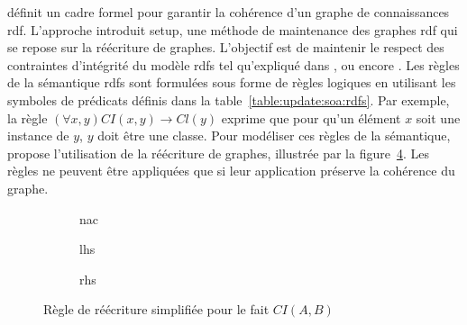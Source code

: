 \cite{chabinUsingGraphGrammar2019} définit un cadre formel pour garantir la cohérence d'un graphe de connaissances \gls{rdf}.
L'approche introduit \gls{setup}, une méthode de maintenance des graphes \gls{rdf} qui se repose sur la réécriture de graphes.
L'objectif est de maintenir le respect des contraintes d'intégrité du modèle \gls{rdfs} tel qu'expliqué dans \cite{flourisFormalFoundationsRDF2013}, \cite{halfedferrariRDFUpdatesConstraints2017} ou encore \cite{chabinConsistentUpdatingDatabases2020}.
Les règles de la sémantique \gls{rdfs} sont formulées sous forme de règles logiques en utilisant les symboles de prédicats définis dans la table~\ref{table:update:soa:rdfs}.
Par exemple, la règle $(\forall x,y) CI(x,y) \to Cl(y)$ exprime que pour qu'un élément $x$ soit une instance de $y$, $y$ doit être une classe.
Pour modéliser ces règles de la sémantique, \cite{chabinUsingGraphGrammar2019} propose l'utilisation de la réécriture de graphes, illustrée par la figure~\ref{fig:gram_rule}.
Les règles ne peuvent être appliquées que si leur application préserve la cohérence du graphe.

\begin{figure}[htb]
    \centering
    \begin{subfigure}[b]{.3\textwidth}
        \centering
        \caption{\acs{nac}}
        \label{fig:gram_rule:nac}
    \end{subfigure}
    \begin{subfigure}[b]{.3\textwidth}
        \centering
        \caption{\acs{lhs}}
        \label{fig:gram_rule:lhs}
    \end{subfigure}
    \begin{subfigure}[b]{.3\textwidth}
        \centering
        \caption{\acs{rhs}}
        \label{fig:gram_rule:rhs}
    \end{subfigure}
    \caption{Règle de réécriture simplifiée pour le fait $CI(A,B)$}
    \label{fig:gram_rule}
\end{figure}

